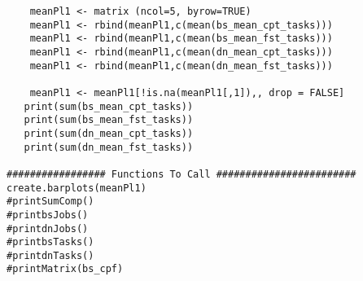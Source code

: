 \begin{verbatim}
	meanPl1 <- matrix (ncol=5, byrow=TRUE)		
	meanPl1 <- rbind(meanPl1,c(mean(bs_mean_cpt_tasks)))
	meanPl1 <- rbind(meanPl1,c(mean(bs_mean_fst_tasks)))
	meanPl1 <- rbind(meanPl1,c(mean(dn_mean_cpt_tasks)))
	meanPl1 <- rbind(meanPl1,c(mean(dn_mean_fst_tasks)))

	meanPl1 <- meanPl1[!is.na(meanPl1[,1]),, drop = FALSE]
   print(sum(bs_mean_cpt_tasks))
   print(sum(bs_mean_fst_tasks))
   print(sum(dn_mean_cpt_tasks))
   print(sum(dn_mean_fst_tasks))

################# Functions To Call ########################
create.barplots(meanPl1)
#printSumComp()
#printbsJobs()
#printdnJobs()
#printbsTasks()
#printdnTasks()
#printMatrix(bs_cpf)

\end{verbatim}